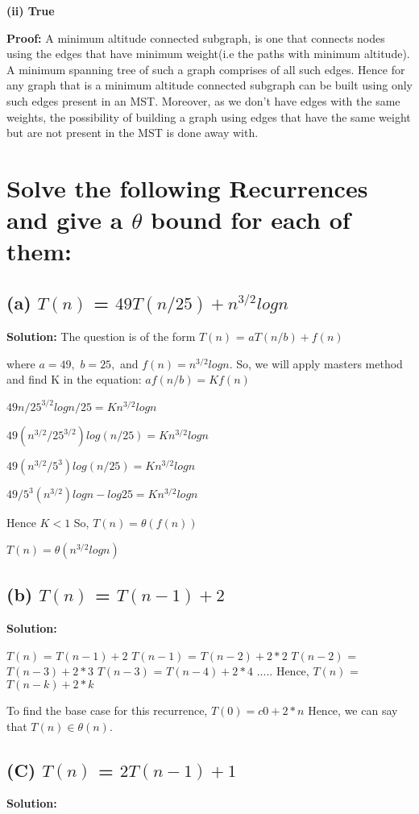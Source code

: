 \documentclass[12pt]{article}
\begin{document}
\textbf{(ii) True}


\textbf{Proof:}
A minimum altitude connected subgraph, is one that connects nodes using the edges that have minimum weight(i.e the paths with minimum altitude). A minimum spanning tree of such a graph comprises of all such edges. Hence for any graph that is a minimum altitude connected subgraph can be built using only such edges present in an MST. Moreover, as we don't have edges with the same weights, the possibility of building a graph using edges that have the same weight but are not present in the MST is done away with.


\section{Solve the following Recurrences and give a $\theta$ bound for each of them:}
\subsection{(a) $T(n)$ = $49T(n/25)+n^{3/2}logn$}
\textbf{Solution:}
The question is of the form $T(n)$ = $aT(n/b)+f(n)$

where $a=49,$ $b=25,$ and $f(n)=n^{3/2}logn.$
So, we will apply masters method and find K in the equation:
$af(n/b) = Kf(n)$

$49 {n/25}^{3/2}log{n/25}=K n^{3/2}logn$

$49 (n^{3/2}/25^{3/2})log({n/25})=K n^{3/2}logn $

$49 (n^{3/2}/5^{3})log({n/25})=K n^{3/2}logn $

$49/5^{3} (n^{3/2})logn - log 25 =K n^{3/2}logn $

Hence $K<1$
So, $T(n)=\theta(f(n))$

 $T(n)=\theta(n^{3/2}logn)$


\subsection{(b) $T(n)$ = $T(n-1)+2$}
\textbf{Solution:}

$T(n)$ = $T(n-1)+2$
$T(n-1)$ = $T(n-2)+2*2$
$T(n-2)$ = $T(n-3)+2*3$
$T(n-3)$ = $T(n-4)+2*4$
$.....$
Hence, $T(n)$ = $T(n-k)+ 2*k$

To find the base case for this recurrence, $T(0) = c0+2*n$
Hence, we can say that $T(n)\in\theta(n)$. 

\subsection{(C) $T(n)$ = $2T(n-1)+1$}
\textbf{Solution:}
\end{document}
